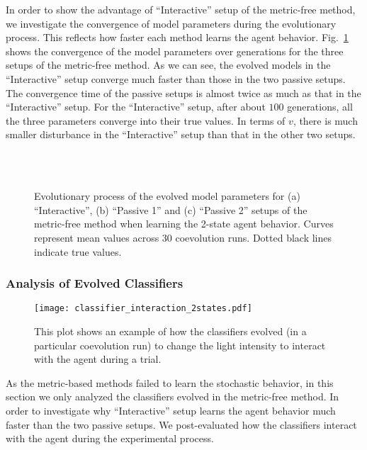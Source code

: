 In order to show the advantage of ``Interactive'' setup of the metric-free method, we investigate the convergence of model parameters during the evolutionary process. This reflects how faster each method learns the agent behavior. Fig.~\ref{fig:model_parameters_convergence_stochastic_2states} shows the convergence of the model parameters over generations for the three setups of the metric-free method. As we can see, the evolved models in the ``Interactive'' setup converge much faster than those in the two passive setups. The convergence time of the passive setups is almost twice as much as that in the ``Interactive'' setup. For the ``Interactive'' setup, after about $100$ generations, all the three parameters converge into their true values. In terms of $v$, there is much smaller disturbance in the ``Interactive'' setup than that in the other two setups. 

\begin{figure}[!t]%
	\centering
		\\
		\\
		\caption{Evolutionary process of the evolved model parameters for (a) ``Interactive'', (b) ``Passive 1'' and (c) ``Passive 2'' setups of the metric-free method when learning the 2-state agent behavior. Curves represent mean values across 30 coevolution runs. Dotted black lines indicate true values.\label{fig:model_parameters_convergence_stochastic_2states}}
\end{figure}

\subsubsection{Analysis of Evolved Classifiers}
%
\begin{figure}[!t]
\centering
\texttt{[image: classifier\_interaction\_2states.pdf]}
\caption{This plot shows an example of how the classifiers evolved (in a particular coevolution run) to change the light intensity to interact with the agent during a trial.}
\label{fig:classifier_interaction_2states}
\end{figure}
%
As the metric-based methods failed to learn the stochastic behavior, in this section  we only analyzed the classifiers evolved in the metric-free method. In order to investigate why ``Interactive'' setup learns the agent behavior much faster than the two passive setups. We post-evaluated how the classifiers interact with the agent during the experimental process. 

